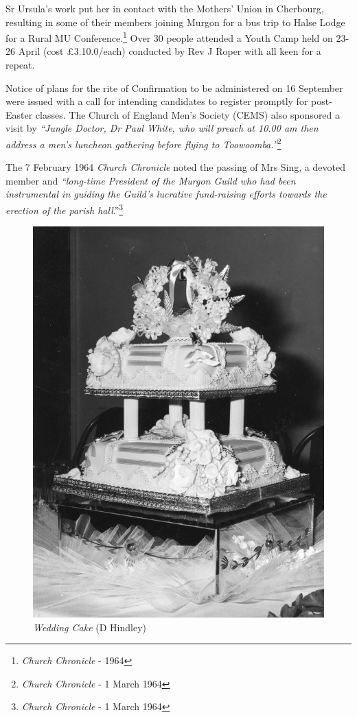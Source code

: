 Sr Ursula's work put her in contact with the Mothers' Union in Cherbourg, resulting in some of their members joining Murgon for a bus trip to Halse Lodge for a Rural MU Conference.\footnote{\emph{Church Chronicle} - 1964} Over 30 people attended a Youth Camp held on 23-26 April (cost \pounds3.10.0/each) conducted by Rev J Roper with all keen for a repeat.


Notice of plans for the rite of Confirmation to be administered on 16 September were issued with a call for intending candidates to register promptly for post-Easter classes. The Church of England Men's Society (CEMS) also sponsored a visit by \emph{``Jungle Doctor, Dr Paul White, who will preach at 10.00 am then address a men's luncheon gathering before flying to Toowoomba.''}\footnote{\emph{Church Chronicle} - 1 March 1964}


The 7 February 1964 \emph{Church Chronicle} noted the passing of Mrs Sing, a devoted member and \emph{``long-time President of the Murgon Guild who had been instrumental in guiding the Guild's lucrative fund-raising efforts towards the erection of the parish hall}.''\footnote{\emph{Church Chronicle} - 1 March 1964}








\begin{figure}
\begin{center}
\includegraphics[width=.62\linewidth,center]{../images/donnaWeddingCake.jpg}
\caption{{\itshape Wedding Cake} {\scriptsize(D Hindley)}}
\end{center}
\end{figure}




